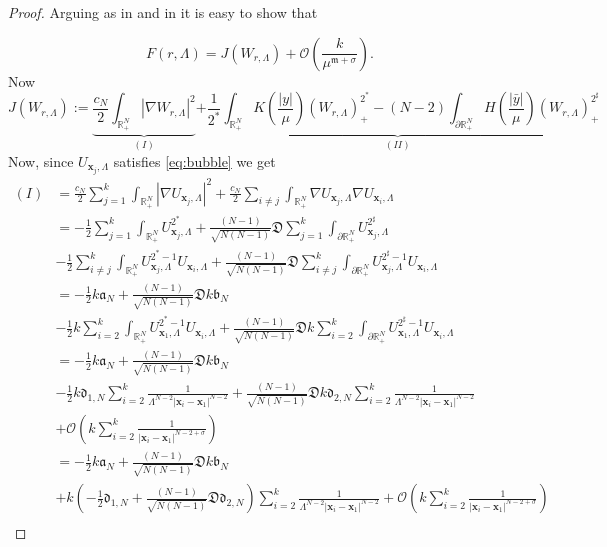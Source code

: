 \documentclass[11pt,a4paper]{amsart}
\begin{document}
\begin{proof}
Arguing as in \cite{WangZhao_2013} and in \cite{WeiYan_2010a} it is easy to show that

$$F(r, \Lambda)=J(W_{r, \Lambda})+\mathcal O\left(\frac{k}{\mu^{\mathfrak m+\sigma}}\right).$$
Now
$$J(W_{r, \Lambda}):=\underbrace{\frac{c_N}{2}\int_{\mathbb R^N_+}|\nabla W_{r, \Lambda}|^2}_{(I)}\underbrace{+\frac{1}{2^*}\int_{\mathbb R^N_+} K\left(\frac{|y|}{\mu}\right)(W_{r, \Lambda})^{2^*}_+-(N-2)\int_{\partial \mathbb R^N_+}H\left(\frac{|\bar y|}{\mu}\right)(W_{r, \Lambda})^{2^\sharp}_+}_{(II)}$$
Now, since $U_{\mathbf{x}_j,\Lambda}$ satisfies \eqref{eq:bubble} we get
$$\begin{aligned}(I)&=\frac{c_N}{2}\sum_{j=1}^k\int_{\mathbb R^N_+}|\nabla U_{\mathbf{x}_j,\Lambda}|^2+\frac{c_N}{2}\sum_{i\neq j}\int_{\mathbb R^N_+}\nabla U_{\mathbf{x}_j,\Lambda}\nabla U_{\mathbf{x}_i,\Lambda}\\
&=-\frac 12 \sum_{j=1}^k \int_{\mathbb R^N_+}U_{\mathbf{x}_j,\Lambda}^{2^*}+\frac{(N-1)}{\sqrt{N(N-1)}}\mathfrak D \sum_{j=1}^k\int_{\partial\mathbb R^N_+}U_{\mathbf{x}_j,\Lambda}^{2^\sharp}\\
&-\frac 12 \sum_{i\neq j}^k \int_{\mathbb R^N_+}U_{\mathbf{x}_j,\Lambda}^{2^*-1}U_{\mathbf{x}_i,\Lambda}+\frac{(N-1)}{\sqrt{N(N-1)}}\mathfrak D \sum_{i\neq j}^k\int_{\partial\mathbb R^N_+}U_{\mathbf{x}_j,\Lambda}^{2^\sharp-1}U_{\mathbf{x}_i,\Lambda}\\
&=-\frac 12 k \mathfrak a_N+\frac{(N-1)}{\sqrt{N(N-1)}}\mathfrak Dk\mathfrak b_N\\
&-\frac 12 k\sum_{i=2}^k \int_{\mathbb R^N_+}U_{\mathbf{x}_1,\Lambda}^{2^*-1}U_{\mathbf{x}_i,\Lambda}+\frac{(N-1)}{\sqrt{N(N-1)}}\mathfrak Dk \sum_{i=2}^k\int_{\partial\mathbb R^N_+}U_{\mathbf{x}_1,\Lambda}^{2^\sharp-1}U_{\mathbf{x}_i,\Lambda}\\
&=-\frac 12 k \mathfrak a_N+\frac{(N-1)}{\sqrt{N(N-1)}}\mathfrak Dk\mathfrak b_N\\
&-\frac 12 k \mathfrak d_{1, N}\sum_{i=2}^k\frac{1}{\Lambda^{N-2}|\mathbf{x}_i-\mathbf{x}_1|^{N-2}}+\frac{(N-1)}{\sqrt{N(N-1)}}\mathfrak Dk\mathfrak d_{2, N}\sum_{i=2}^k\frac{1}{\Lambda^{N-2}|\mathbf{x}_i-\mathbf{x}_1|^{N-2}}\\
&+\mathcal O\left(k\sum_{i=2}^k\frac{1}{|\mathbf{x}_i-\mathbf{x}_1|^{N-2+\sigma}}\right)\\
&=-\frac 12 k \mathfrak a_N+\frac{(N-1)}{\sqrt{N(N-1)}}\mathfrak Dk\mathfrak b_N\\
&+k\left(-\frac 12\mathfrak d_{1, N}+\frac{(N-1)}{\sqrt{N(N-1)}}\mathfrak D\mathfrak d_{2, N} \right)\sum_{i=2}^k\frac{1}{\Lambda^{N-2}|\mathbf{x}_i-\mathbf{x}_1|^{N-2}}+\mathcal O\left(k\sum_{i=2}^k\frac{1}{|\mathbf{x}_i-\mathbf{x}_1|^{N-2+\sigma}}\right)\\

\end{aligned}$$
\end{proof}
\end{document}
